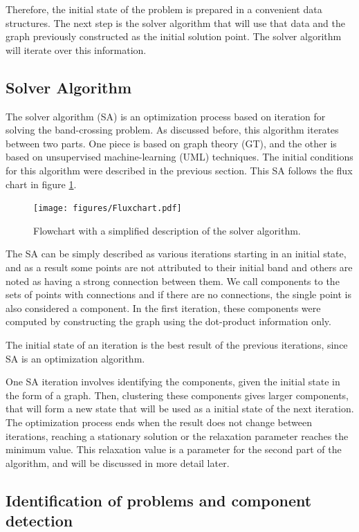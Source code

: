 \documentclass[a4paper,12pt]{report}
\begin{document}
\begin{appendices}
Therefore, the initial state of the problem is prepared in a convenient data structures.
The next step is the solver algorithm that will use that data and the graph previously constructed as the initial solution point.
The solver algorithm will iterate over this information.

\subsection{Solver Algorithm}

The solver algorithm (SA) is an optimization process based on iteration for solving the band-crossing problem.
As discussed before, this algorithm iterates between two parts.
One piece is based on graph theory (GT), and the other is based on unsupervised machine-learning (UML) techniques.
The initial conditions for this algorithm were described in the previous section.
This SA follows the flux chart in figure \ref{fig:flux_chart}.


\begin{figure}
    \centering
    \texttt{[image: figures/Fluxchart.pdf]}
    \caption{Flowchart with a simplified description of the solver algorithm.}
    \label{fig:flux_chart}
\end{figure}


The SA can be simply described as various iterations starting in an initial state, and as a result some points are not attributed to their initial band and others are noted as having a strong connection between them.
We call components to the sets of points with connections and if there are no connections, the single point is also considered a component.
In the first iteration, these components were computed by constructing the graph using the dot-product information only.

The initial state of an iteration is the best result of the previous iterations, since SA  is an optimization algorithm.

One SA iteration involves identifying the components, given the initial state in the form of a graph.
Then, clustering these components gives larger components, that will form a new state that will be used as a initial state of the next iteration.
The optimization process ends when the result does not change between iterations, reaching a stationary solution or the relaxation parameter reaches the minimum value.
This relaxation value is a parameter for the second part of the algorithm, and will be discussed in more detail later.


\subsection{Identification of problems and component detection}


\end{appendices}
\end{document}
